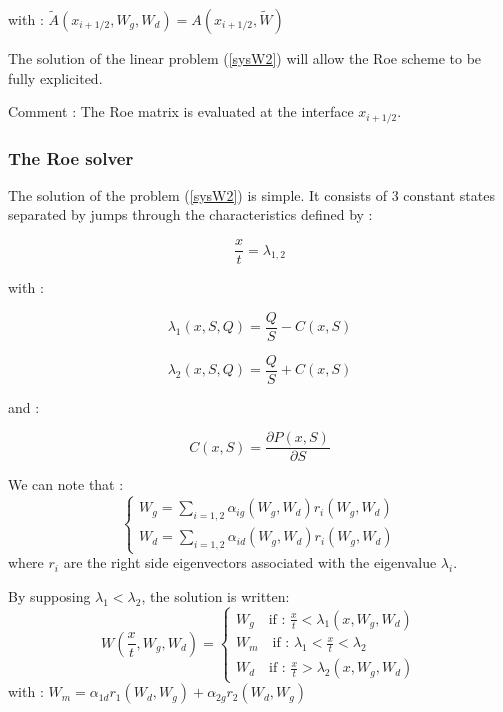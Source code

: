 with : $\tilde A(x_{i+1/2},W_g,W_d) = A(x_{i+1/2},\tilde W)$

The solution of the linear problem (\ref{sysW2}) will allow the Roe scheme to be fully explicited.

\begin{CommentBlock}{Comment :}
The Roe matrix is evaluated at the interface $x_{i+1/2}$.
\end{CommentBlock}

\subsubsection{The Roe solver}

The solution of the problem (\ref{sysW2}) is simple. It consists of 3 constant states separated by jumps through the characteristics defined by :

\begin{equation}
  \frac{x}{t}=\lambda_{1,2}
\end{equation}

with :

\begin{equation}
 \lambda_1(x,S,Q) = \frac{Q}{S} - C(x,S)
\end{equation}

\begin{equation}
 \lambda_2(x,S,Q) = \frac{Q}{S} + C(x,S)
\end{equation}

and :

\begin{equation}
 C(x,S) = \frac{\partial P(x,S)}{\partial S}
\end{equation}

We can note that :
\begin{equation}
 \left \lbrace
  \begin{array}{l}
   W_g = \sum_{i=1,2} \alpha_{ig}(W_g,W_d) r_i(W_g,W_d) \\
   W_d = \sum_{i=1,2} \alpha_{id}(W_g,W_d) r_i(W_g,W_d)
\end{array}
 \right.
\end{equation}
where $r_i$ are the right side eigenvectors associated with the eigenvalue $\lambda_i$.

By supposing $\lambda_1 < \lambda_2$, the solution is written:
\begin{equation}
 W(\frac{x}{t},W_g , W_d ) = \left \lbrace
  \begin{array}{l}
   W_g \quad \mbox{if : } \frac{x}{t} < \lambda_1 (x,W_g,W_d) \\
   W_m \quad \mbox{if : } \lambda_1 < \frac{x}{t} < \lambda_2 \\
   W_d \quad \mbox{if : } \frac{x}{t} > \lambda_2 (x,W_g,W_d)
  \end{array}
 \right.
\end{equation}
with : $W_m = \alpha_{1d} r_1 (W_d,W_g) + \alpha_{2g} r_2 (W_d,W_g)$

